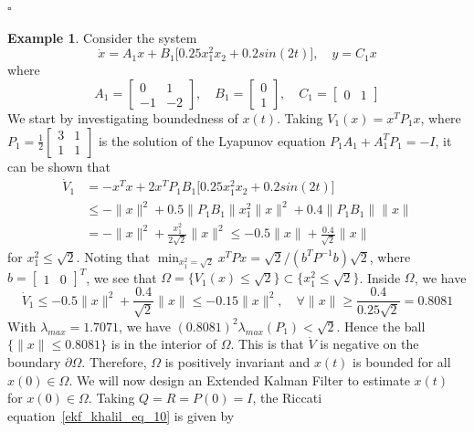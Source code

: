 \documentclass[11pt,a4paper,oneside]{book}
\numberwithin{equation}{section}
\theoremstyle{it}
\theoremstyle{definition}
\newtheorem{example}{Example}[section]
\begin{document}
\hfill $\square$
\begin{example} Consider the system
	\begin{equation*}
		\dot{x}=A_1x+B_1\big[0.25x_1^2x_2+0.2sin(2t)\big], \quad y=C_1x
	\end{equation*}
where
\begin{equation*}
	A_1=\begin{bmatrix} 0&1 \\[6pt] -1&-2
	\end{bmatrix},\quad
	B_1=\begin{bmatrix}	0 \\[6pt] 1
	\end{bmatrix},\quad
	C_1=\begin{bmatrix}	0 & 1
	\end{bmatrix}
\end{equation*}
We start by investigating boundedness of $x(t)$. Taking $V_1(x) = x^TP_1x$, where $P_1=\frac{1}{2}\begin{bmatrix}
	3&1\\1&1 \end{bmatrix}$ is the solution of the Lyapunov equation $P_1A_1+A_1^TP_1=-I$, it can be shown that
\begin{equation*}
	\begin{aligned}
		\dot{V}_1&=-x^Tx + 2x^TP_1B_1\big[0.25x_1^2x_2+0.2sin(2t)\big] \\[6pt]
		&\le -\|x\|^2+0.5\|P_1B_1\|x_1^2\|x\|^2+0.4\|P_1B_1\|\|x\| \\[6pt]
		&= -\|x\|^2+\frac{x_1^2}{2\sqrt{2}}\|x\|^2\le-0.5\|x\|+\frac{0.4}{\sqrt{2}}\|x\|
	\end{aligned}
\end{equation*}
for $x_1^2\le\sqrt{2}$. Noting that $\min_{x_1^2=\sqrt{2}}x^TPx=\sqrt{2}/(b^TP^{-1}b)\sqrt{2}$, where $b=\begin{bmatrix} 1&0 \end{bmatrix}^T$, we see that $\Omega=\big\{V_1(x)\le\sqrt{2}\big\}\subset\big\{x_1^2\le\sqrt{2}\big\}$. Inside $\Omega$, we have
\begin{equation*}
	\dot{V}_1\le-0.5\|x\|^2+\frac{0.4}{\sqrt{2}}\|x\|\le-0.15\|x\|^2,\quad\forall\|x\|\ge\frac{0.4}{0.25\sqrt{2}}=0.8081
\end{equation*}
With $\lambda_{max}=1.7071$, we have $(0.8081)^2\lambda_{max}(P_1)<\sqrt{2}$. Hence the ball $\big\{\|x\|\le0.8081\big\}$ is in the interior of $\Omega$. This is that $\dot{V}$ is negative on the boundary $\partial\Omega$. Therefore, $\Omega$ is positively invariant and $x(t)$ is bounded for all $x(0)\in\Omega$. We will now design an Extended Kalman Filter to estimate $x(t)$ for $x(0)\in\Omega$. Taking $Q=R=P(0)=I$, the Riccati equation~\eqref{ekf_khalil_eq_10} is given by

\end{example}
\end{document}
